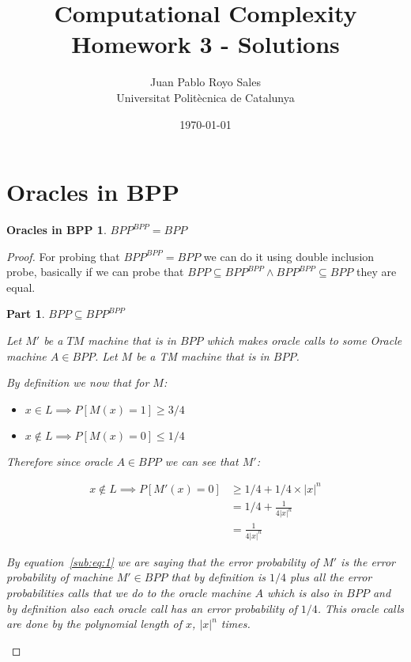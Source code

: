 \documentclass[12pt, a4paper]{article}
\title{%
  Computational Complexity \\
  Homework 3 - Solutions
}
\author{%
  Juan Pablo Royo Sales\\
  \small{Universitat Politècnica de Catalunya}
}
\date\today
\begin{document}
\maketitle

\section{Oracles in BPP}\label{ex:1}
\newtheorem{obpp}{Oracles in BPP}
\newtheorem{proofpart}{Part}
\begin{obpp}
$BPP^{BPP} = BPP$
\end{obpp}

\begin{proof}
For probing that $BPP^{BPP} = BPP$ we can do it using double inclusion probe, basically if we can probe that $BPP \subseteq BPP^{BPP} \land BPP^{BPP} \subseteq BPP$ they are equal.

\begin{proofpart}
$BPP \subseteq BPP^{BPP}$

Let $M'$ be a $TM$ machine that is in $BPP$ which makes oracle calls to some Oracle machine $A \in BPP$. Let $M$ be a TM machine that is in $BPP$.

By definition we now that for $M$:

\begin{itemize}
  \item $x \in L \implies P[M(x) = 1] \geq 3/4$
  \item $x \notin L \implies P[M(x) = 0] \leq 1/4$
\end{itemize}

Therefore since oracle $A \in BPP$ we can see that $M'$:

\begin{subequations}
  \begin{align}
    x \notin L \implies P[M'(x) = 0] &\geq 1/4 + 1/4 \times |x|^n \\\label{sub:eq:1}
                                     &= 1/4 + \frac{1}{4|x|^n}\\
                                     &= \frac{1}{4|x|^n}
  \end{align}
\end{subequations}

By equation~\ref{sub:eq:1} we are saying that the error probability of $M'$ is the error probability of machine $M' \in BPP$ that by definition is $1/4$ plus all the error probabilities calls that we do to the oracle machine $A$ which is also in $BPP$ and by definition also each oracle call has an error probability of $1/4$. This oracle calls are done by the polynomial length of $x$, $|x|^n$ times.


\end{proofpart}
\end{proof}
\end{document}
